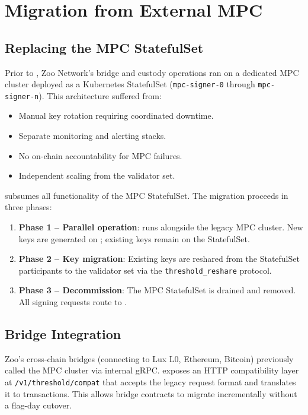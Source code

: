 \section{Migration from External MPC}

\label{sec:migration}

\subsection{Replacing the MPC StatefulSet}

Prior to \TChain{}, Zoo Network's bridge and custody operations ran on a dedicated MPC cluster deployed as a Kubernetes StatefulSet (\texttt{mpc-signer-0} through \texttt{mpc-signer-n}). This architecture suffered from:

\begin{itemize}
\item Manual key rotation requiring coordinated downtime.
\item Separate monitoring and alerting stacks.
\item No on-chain accountability for MPC failures.
\item Independent scaling from the validator set.
\end{itemize}

\TChain{} subsumes all functionality of the MPC StatefulSet. The migration proceeds in three phases:

\begin{enumerate}
\item \textbf{Phase 1 -- Parallel operation}: \TChain{} runs alongside the legacy MPC cluster. New keys are generated on \TChain{}; existing keys remain on the StatefulSet.
\item \textbf{Phase 2 -- Key migration}: Existing keys are reshared from the StatefulSet participants to the \TChain{} validator set via the \texttt{threshold\_reshare} protocol.
\item \textbf{Phase 3 -- Decommission}: The MPC StatefulSet is drained and removed. All signing requests route to \TChain{}.
\end{enumerate}

\subsection{Bridge Integration}

Zoo's cross-chain bridges (connecting to Lux L0, Ethereum, Bitcoin) previously called the MPC cluster via internal gRPC. \TChain{} exposes an HTTP compatibility layer at \texttt{/v1/threshold/compat} that accepts the legacy request format and translates it to \ThresholdVM{} transactions. This allows bridge contracts to migrate incrementally without a flag-day cutover.

